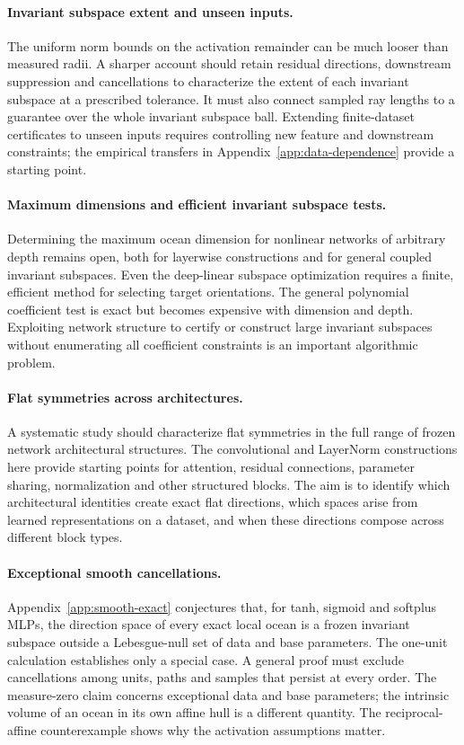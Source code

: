 \paragraph{Invariant subspace extent and unseen inputs.} The uniform norm bounds on the activation remainder can be much looser than measured radii. A sharper account should retain residual directions, downstream suppression and cancellations to characterize the extent of each invariant subspace at a prescribed tolerance. It must also connect sampled ray lengths to a guarantee over the whole invariant subspace ball. Extending finite-dataset certificates to unseen inputs requires controlling new feature and downstream constraints; the empirical transfers in Appendix~\ref{app:data-dependence} provide a starting point.

\paragraph{Maximum dimensions and efficient invariant subspace tests.}
Determining the maximum ocean dimension for nonlinear networks of arbitrary depth remains open, both for layerwise constructions and for general coupled invariant subspaces. Even the deep-linear subspace optimization requires a finite, efficient method for selecting target orientations. The general polynomial coefficient test is exact but becomes expensive with dimension and depth. Exploiting network structure to certify or construct large invariant subspaces without enumerating all coefficient constraints is an important algorithmic problem.

\paragraph{Flat symmetries across architectures.}
A systematic study should characterize flat symmetries in the full range of frozen network architectural structures. The convolutional and LayerNorm constructions here provide starting points for attention, residual connections, parameter sharing, normalization and other structured blocks. The aim is to identify which architectural identities create exact flat directions, which spaces arise from learned representations on a dataset, and when these directions compose across different block types.

\paragraph{Exceptional smooth cancellations.}
Appendix~\ref{app:smooth-exact} conjectures that, for tanh, sigmoid and softplus MLPs, the direction space of every exact local ocean is a frozen invariant subspace outside a Lebesgue-null set of data and base parameters. The one-unit calculation establishes only a special case. A general proof must exclude cancellations among units, paths and samples that persist at every order. The measure-zero claim concerns exceptional data and base parameters; the intrinsic volume of an ocean in its own affine hull is a different quantity. The reciprocal-affine counterexample shows why the activation assumptions matter.


